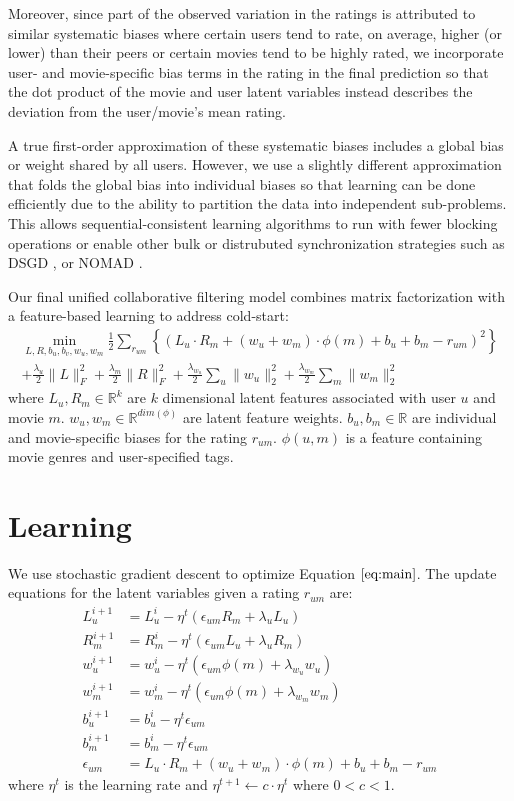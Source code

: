 \documentclass{article} %
\begin{document}
Moreover, since part of the observed variation in the ratings is attributed to similar systematic biases \cite{koren:matrix} where certain users tend to rate, on average, higher (or lower) than their peers or certain movies tend to be highly rated, we incorporate user- and movie-specific bias terms in the rating in the final prediction so that the dot product of the movie and user latent variables instead describes the deviation from the user/movie's mean rating.

A true first-order approximation of these systematic biases includes a global bias or weight shared by all users. However, we use a slightly different approximation that folds the global bias into individual biases so that learning can be done efficiently due to the ability to  partition the data into independent sub-problems. This allows sequential-consistent learning algorithms to run with fewer blocking operations or enable other bulk or distrubuted synchronization strategies such as DSGD \cite{gemulla2011large}, or NOMAD \cite{yun2013nomad}.

Our final unified collaborative filtering model combines matrix factorization with a feature-based learning to address cold-start:
\begin{multline}
\min_{L, R, b_u, b_v, w_u, w_m} \frac{1}{2}\sum_{r_{um}} \left\{(L_u \cdot R_m + (w_u + w_m) \cdot \phi(m) + b_u + b_m - r_{um})^2\right\}\\ + \frac{\lambda_u}{2}\|L\|^2_F + \frac{\lambda_m}{2}\|R\|^2_F + \frac{\lambda_{w_u}}{2}\sum_u\|w_u\|^2_2 + \frac{\lambda_{w_m}}{2}\sum_m\|w_m\|^2_2\label{eq:main}
\end{multline}
where $L_u, R_m \in \mathbb{R}^k$ are $k$ dimensional latent features associated with user $u$ and movie $m$. $w_u,w_m \in \mathbb{R}^{dim(\phi)}$ are latent feature weights. $b_u, b_m \in \mathbb{R}$ are individual and movie-specific biases for the rating $r_{um}$. $\phi(u, m)$ is a feature containing movie genres and user-specified tags. 
\section{Learning}
We use stochastic gradient descent to optimize Equation $\ref{eq:main}$. The update equations for the latent variables given a rating $r_{um}$ are:
\begin{align}
L_u^{i+1} &= L_u^{i} - \eta^t ( \epsilon_{um} R_m  + \lambda_u L_u)\\
R_m^{i+1} &= R_m^{i} - \eta^t ( \epsilon_{um} L_u  + \lambda_u R_m)\\
w_u^{i+1} &= w_u^{i} - \eta^t ( \epsilon_{um} \phi(m) + \lambda_{w_u} w_u)\\
w_m^{i+1} &= w_m^{i} - \eta^t ( \epsilon_{um} \phi(m) + \lambda_{w_m} w_m)\\
b_u^{i+1} &= b_u^{i} - \eta^t \epsilon_{um}\\
b_m^{i+1} &= b_m^{i} - \eta^t \epsilon_{um}\\
\epsilon_{um} &= L_u \cdot R_m + (w_u + w_m) \cdot \phi(m) + b_u + b_m - r_{um}
\end{align}
where $\eta^t$ is the learning rate and $\eta^{t+1} \leftarrow c \cdot \eta^t$ where $0 < c < 1$.
\end{document}
